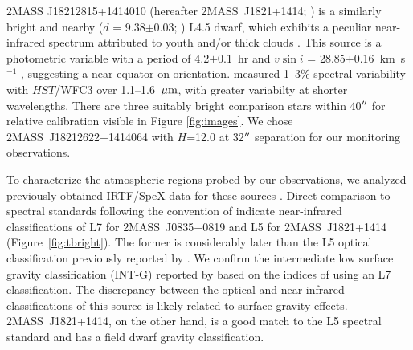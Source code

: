 \documentclass[twocolumn]{aastex6}
\newcommand{\kms}{km~s$^{-1}$}
\newcommand{\sha}{2MASS~J0835$-$0819}
\newcommand{\shb}{2MASS~J1821+1414}
\begin{document}
2MASS J18212815+1414010 (hereafter {\shb}; \citealt{2008ApJ...686..528L}) is a similarly bright and nearby ($d$ = 9.38$\pm$0.03; \citealt{2016MNRAS.455..357S}) L4.5 dwarf, which exhibits a peculiar near-infrared spectrum attributed to youth and/or thick clouds \citep{2008ApJ...686..528L,2015ApJS..219...33G,2016ApJ...833...96L}.
This source is a photometric variable with a period of 4.2$\pm$0.1~hr \citep{2015ApJ...799..154M} and $v\sin{i}$ = 28.85$\pm$0.16~{\kms}  \citep{2010ApJ...723..684B}, suggesting a near equator-on orientation.  \citet{2015ApJ...798L..13Y} measured 1--3\% spectral variability with $HST$/WFC3 over 1.1--1.6~$\mbox{$\mu$m}$, with greater variabilty at shorter wavelengths.
There are three suitably bright comparison stars within 40$\mbox{$^{\prime\prime}$}$ for relative calibration visible in Figure \ref{fig:images}. We chose 2MASS~J18212622+1414064 with $H$=12.0 at 32$\mbox{$^{\prime\prime}$}$ separation for our monitoring observations.

To characterize the atmospheric regions probed by our observations, we analyzed previously 
obtained IRTF/SpeX data for these sources \citep{2008ApJ...686..528L,2010ApJ...710.1142B}.
Direct comparison to spectral standards following the convention of \citet{2010ApJS..190..100K} indicate near-infrared
classifications of L7 for {\sha} and L5 for {\shb} (Figure~\ref{fig:tbright}). The former is considerably later than the L5 optical classification previously reported by \citet{2003AJ....126.2421C}. We confirm the intermediate low surface gravity classification (INT-G) reported by \citet{2016ApJ...833...96L} based on the indices of \citet{2013ApJ...772...79A} using an L7 classification. The discrepancy between the optical and near-infrared classifications of this source is likely related to surface gravity effects. {\shb}, on the other hand, is a good match to the L5 spectral standard and has a field dwarf gravity classification.
\end{document}
